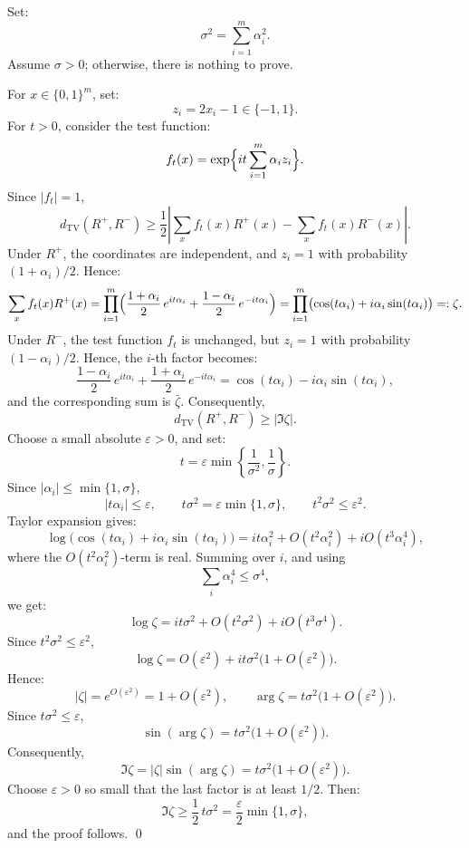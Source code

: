 \documentclass[12pt,reqno]{amsart}
\makeatletter
\renewenvironment{proof}[1][\proofname]{%
  \par\vspace{\topsep}%
  \normalfont\topsep6\p@\@plus6\p@\relax
  \trivlist
  \item[\hskip\labelsep\itshape #1\@addpunct{.}]\ignorespaces
}{%
  \endtrivlist
}
\numberwithin{equation}{section}
\makeatother
\begin{document}
\begin{proof}
Set:
\[
\sigma^2=\sum_{i=1}^m\alpha_i^2.
\]
Assume \(\sigma>0\); otherwise, there is nothing to prove.
\smallskip%

For \(x\in\{0,1\}^m\), set:
\[
z_i=2x_i-1\in\{-1,1\}.
\]
For \(t>0\), consider the test function:
\[
f_t(x)=\exp\Bigl\{it\sum_{i=1}^m\alpha_iz_i\Bigr\}.
\]
Since \(|f_t|=1\),
\[
d_{\mathrm{TV}}(R^+,R^-)
\ge
\frac12
\left|
\sum_xf_t(x)R^+(x)
-
\sum_xf_t(x)R^-(x)
\right|.
\]
Under \(R^+\), the coordinates are independent, and \(z_i=1\) with
probability \((1+\alpha_i)/2\). Hence:
\[
\sum_xf_t(x)R^+(x)
=
\prod_{i=1}^m
\Bigl(
\frac{1+\alpha_i}2\,e^{it\alpha_i}
+
\frac{1-\alpha_i}2\,e^{-it\alpha_i}
\Bigr)
=
\prod_{i=1}^m
\bigl(\cos(t\alpha_i)+i\alpha_i\sin(t\alpha_i)\bigr)
=:
\zeta.
\]
Under \(R^-\), the test function \(f_t\) is unchanged, but \(z_i=1\)
with probability \((1-\alpha_i)/2\). Hence, the \(i\)-th factor becomes:
\[
\frac{1-\alpha_i}2\,e^{it\alpha_i}
+
\frac{1+\alpha_i}2\,e^{-it\alpha_i}
=
\cos(t\alpha_i)-i\alpha_i\sin(t\alpha_i),
\]
and the corresponding sum is \(\bar\zeta\). Consequently,
\begin{equation}\label{imag_lower}
d_{\mathrm{TV}}(R^+,R^-)
\ge
|\Im\zeta|.
\end{equation}
Choose a small absolute \(\varepsilon>0\), and set:
\[
t
=
\varepsilon
\min\left\{
\frac1{\sigma^2},\frac1\sigma
\right\}.
\]
Since \(|\alpha_i|\le\min\{1,\sigma\}\),
\[
|t\alpha_i|\le\varepsilon,
\qquad
t\sigma^2=\varepsilon\min\{1,\sigma\},
\qquad
t^2\sigma^2\le\varepsilon^2.
\]
Taylor expansion gives:
\[
\log\bigl(\cos(t\alpha_i)+i\alpha_i\sin(t\alpha_i)\bigr)
=
it\alpha_i^2
+
O(t^2\alpha_i^2)
+
iO(t^3\alpha_i^4),
\]
where the \(O(t^2\alpha_i^2)\)-term is real. Summing
over \(i\), and using 
\[
\sum_i\alpha_i^4\le\sigma^4,
\]
we get:
\[
\log\zeta
=
it\sigma^2
+
O(t^2\sigma^2)
+
iO(t^3\sigma^4).
\]
Since \(t^2\sigma^2\le\varepsilon^2\),
\[
\log\zeta
=
O(\varepsilon^2)
+
it\sigma^2\bigl(1+O(\varepsilon^2)\bigr).
\]
Hence:
\[
|\zeta|
=
e^{O(\varepsilon^2)}
=
1+O(\varepsilon^2),
\qquad
\arg\zeta
=
t\sigma^2\bigl(1+O(\varepsilon^2)\bigr).
\]
Since \(t\sigma^2\le\varepsilon\),
\[
\sin(\arg\zeta)
=
t\sigma^2\bigl(1+O(\varepsilon^2)\bigr).
\]
Consequently,
\[
\Im\zeta
=
|\zeta|\sin(\arg\zeta)
=
t\sigma^2\bigl(1+O(\varepsilon^2)\bigr).
\]
Choose \(\varepsilon>0\) so small that the last factor is at least
\(1/2\). Then:
\[
\Im\zeta
\ge
\frac12\,t\sigma^2
=
\frac\varepsilon2\min\{1,\sigma\},
\]
and the proof follows. \qed
\end{proof}
\end{document}
